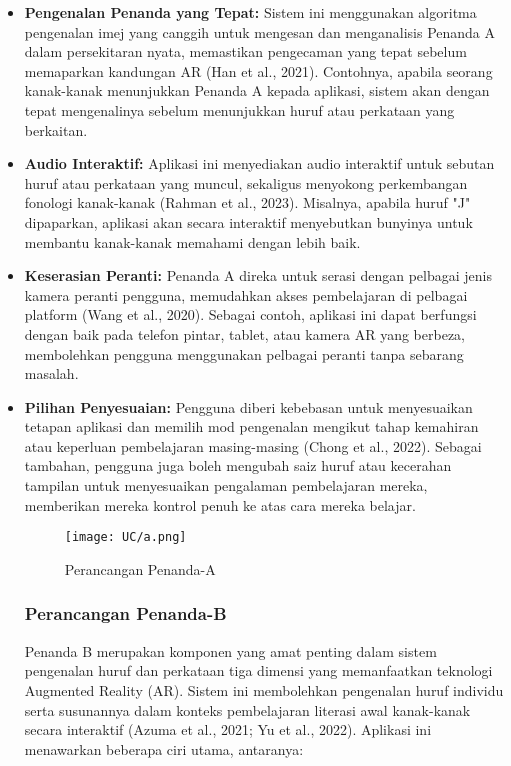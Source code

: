 \begin{itemize}
\item \textbf{Pengenalan Penanda yang Tepat:} Sistem ini menggunakan algoritma pengenalan imej yang canggih untuk mengesan dan menganalisis Penanda A dalam persekitaran nyata, memastikan pengecaman yang tepat sebelum memaparkan kandungan AR (Han et al., 2021). Contohnya, apabila seorang kanak-kanak menunjukkan Penanda A kepada aplikasi, sistem akan dengan tepat mengenalinya sebelum menunjukkan huruf atau perkataan yang berkaitan.  \\
\item \textbf{Audio Interaktif:} Aplikasi ini menyediakan audio interaktif untuk sebutan huruf atau perkataan yang muncul, sekaligus menyokong perkembangan fonologi kanak-kanak (Rahman et al., 2023). Misalnya, apabila huruf "J" dipaparkan, aplikasi akan secara interaktif menyebutkan bunyinya untuk membantu kanak-kanak memahami dengan lebih baik. \\ 
\item \textbf{Keserasian Peranti:} Penanda A direka untuk serasi dengan pelbagai jenis kamera peranti pengguna, memudahkan akses pembelajaran di pelbagai platform (Wang et al., 2020). Sebagai contoh, aplikasi ini dapat berfungsi dengan baik pada telefon pintar, tablet, atau kamera AR yang berbeza, membolehkan pengguna menggunakan pelbagai peranti tanpa sebarang masalah.  \\
\item \textbf{Pilihan Penyesuaian:} Pengguna diberi kebebasan untuk menyesuaikan tetapan aplikasi dan memilih mod pengenalan mengikut tahap kemahiran atau keperluan pembelajaran masing-masing (Chong et al., 2022). Sebagai tambahan, pengguna juga boleh mengubah saiz huruf atau kecerahan tampilan untuk menyesuaikan pengalaman pembelajaran mereka, memberikan mereka kontrol penuh ke atas cara mereka belajar.  \\

\begin{figure}
    \centering
    \texttt{[image: UC/a.png]}
    \caption{Perancangan Penanda-A}
    \label{fig:A}
\end{figure}
\clearpage


 \subsubsection{Perancangan Penanda-B}
Penanda B merupakan komponen yang amat penting dalam sistem pengenalan huruf dan perkataan tiga dimensi yang memanfaatkan teknologi Augmented Reality (AR). Sistem ini membolehkan pengenalan huruf individu serta susunannya dalam konteks pembelajaran literasi awal kanak-kanak secara interaktif (Azuma et al., 2021; Yu et al., 2022). Aplikasi ini menawarkan beberapa ciri utama, antaranya:\\
 

\end{itemize}
